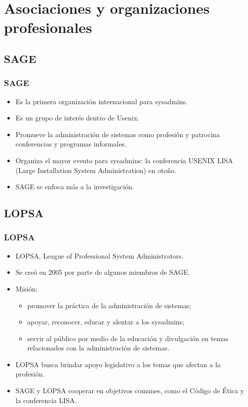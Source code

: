 \documentclass{beamer}
\begin{document}
\section{Asociaciones y organizaciones profesionales}

\subsection{SAGE}
\begin{frame}
\frametitle{SAGE}

\begin{itemize}
\item Es la primera organización internacional para sysadmins.
\item Es un grupo de interés dentro de Usenix.
\item Promueve la administración de sistemas como profesión y patrocina conferencias y programas informales.
\item Organiza el mayor evento para sysadmins: la conferencia USENIX LISA (Large Installation System Administration) en otoño.
\item SAGE se enfoca más a la investigación.
\end{itemize}
\end{frame}


\subsection{LOPSA}
\begin{frame}
\frametitle{LOPSA}

\begin{itemize}
\item LOPSA, League of Professional System Administrators.
\item Se creó en 2005 por parte de algunos miembros de SAGE. 
\item Misión: 
	\begin{itemize}
	\item promover la práctica de la administración de sistemas; 
	\item apoyar, reconocer, educar y alentar a los sysadmins; 	
 	\item servir al público por medio de la educación y divulgación en temas relacionados con la administración de sistemas.
	\end{itemize}
\item LOPSA busca brindar apoyo legislativo a los temas que afectan a la profesión.
\item SAGE y LOPSA cooperar en objetivos comunes, como el Código de Ética y la conferencia LISA.

\end{itemize}
\end{frame}
\end{document}
